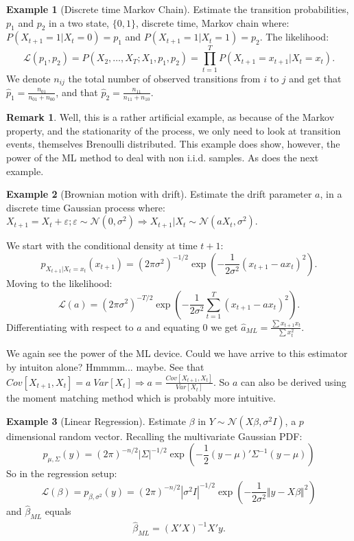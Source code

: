 \documentclass[12pt,a4paper]{article}
\theoremstyle{plain}
\theoremstyle{definition}
\newtheorem{remark}{Remark}
\newtheorem{example}{Example}
\newcommand{\gauss}[1]{\mathcal{N}\left(#1\right)}
\newcommand{\norm}[1]{\Vert #1 \Vert}
\newcommand{\lik}{\mathcal{L}}
\begin{document}
\begin{example}[Discrete time Markov Chain]

Estimate the transition probabilities,  $p_1$ and $p_2$ in a two state, $\{0,1\}$, discrete time, Markov chain where:
$P(X_{t+1}=1|X_{t}=0)=p_1$ and $P(X_{t+1}=1|X_{t}=1)=p_2$.
The likelihood:
$$
  \lik(p_1,p_2)=
  P(X_2,\dots,X_T;X_1,p_1,p_2)=
  \prod_{t=1}^T P(X_{t+1}=x_{t+1}|X_{t}=x_t).
$$
We denote $n_{ij}$ the total number of observed transitions from $i$ to $j$ and get that $\hat{p}_1=\frac{n_{01}}{n_{01}+n_{00}}$, and that $\hat{p}_2=\frac{n_{11}}{n_{11}+n_{10}}$.

\begin{remark}
Well, this is a rather artificial example, as because of the Markov property, and the stationarity of the process, we only need to look at transition events, themselves Brenoulli distributed. 
This example does show, however, the power of the ML method to deal with non i.i.d. samples. As does the next example.
\end{remark}
\end{example}

\begin{example}[Brownian motion with drift]
Estimate the drift parameter $a$,  in a discrete time Gaussian process where:
$X_{t+1}=X_t+\varepsilon; \varepsilon \sim \gauss{0,\sigma^2} \Rightarrow X_{t+1}|X_t \sim \gauss{a X_t,\sigma^2}$.

We start with the conditional density at time $t+1$:
$$
  p_{X_{t+1}|X_t=x_t}(x_{t+1}) = 
  (2 \pi \sigma^2)^{-1/2} \exp \left( 
    -\frac{1}{2 \sigma^2}(x_{t+1}-a x_t)^2 
  \right).
$$
Moving to the likelihood:
$$
  \lik(a) = 
  (2 \pi \sigma^2)^{-T/2} \exp \left(
    -\frac{1}{2 \sigma^2}\sum_{t=1}^T (x_{t+1}-a x_t)^2 
  \right).
$$
Differentiating with respect to $a$ and equating $0$ we get $\hat{a}_{ML}=\frac{\sum x_{t+1}x_{t}}{\sum x_t^2}$.

We again see the power of the ML device.
Could we have arrive to this estimator by intuiton alone? Hmmmm... maybe. 
See that $Cov[X_{t+1},X_t] = a \; Var[X_t] \Rightarrow a=\frac{Cov[X_{t+1},X_t]}{Var[X_t]}$.
So $a$ can also be derived using the moment matching method which is probably more intuitive.

\end{example}

\begin{example}[Linear Regression]

Estimate $\beta$ in $Y \sim \gauss{X\beta,\sigma^2 I}$, a $p$ dimensional random vector.
Recalling the multivariate Gaussian PDF:
$$
  p_{\mu,\Sigma}(y) = 
  (2 \pi)^{-n/2} |\Sigma|^{-1/2} \exp\left(
    -\frac{1}{2} (y-\mu)' \Sigma^{-1} (y-\mu)
  \right)
$$
So in the regression setup:
$$
  \lik(\beta)= 
  p_{\beta,\sigma^2}(y) = 
  (2 \pi)^{-n/2} |\sigma^2 I|^{-1/2} \exp\left(
    -\frac{1}{2 \sigma^2} \norm{y-X\beta}^2
  \right)
$$
and $\hat{\beta}_{ML}$ equals 
\begin{align}
	\hat{\beta}_{ML}=(X'X)^{-1} X'y.
\end{align}


\end{example}
\end{document}
